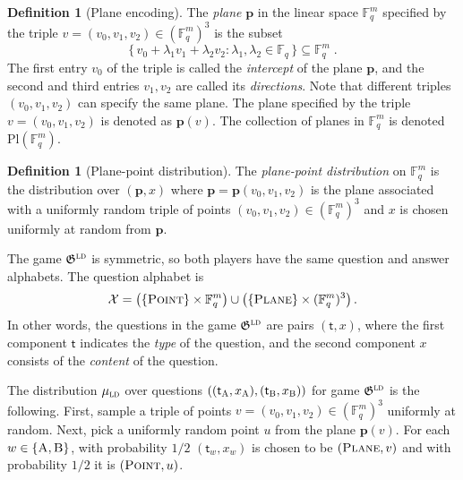 \documentclass[11pt]{article}
\theoremstyle{definition}
\newtheorem{definition}[theorem]{Definition}
\newcommand{\F}{\ensuremath{\mathbb{F}}}
\newcommand{\ld}{\textsc{ld}}
\newcommand{\mX}{\ensuremath{\mathcal{X}}}
\newcommand{\pl}{\mathbf{p}}
\newcommand{\Pl}{\ensuremath{\mathrm{Pl}}}
\newcommand{\game}{\mathfrak{G}}
\newcommand{\labelstyle}[1]{\ensuremath{\textsc{#1}}\xspace}
\newcommand{\tvarstyle}[1]{\mathsf{#1}}
\newcommand{\tvar}{\ensuremath{\tvarstyle{t}}}
\newcommand{\alice}{\labelstyle{A}}
\newcommand{\bob}{\labelstyle{B}}
\newcommand{\typestyle}[1]{\ensuremath{\textsc{#1}}\xspace}
\newcommand{\Plane}{\typestyle{Plane}}
\newcommand{\Point}{\typestyle{Point}}
\newcommand{\AB}{\{\alice, \bob\}}
\begin{document}
\begin{definition}[Plane encoding]
  \label{def:plane-point}
  The \emph{plane} $\pl$ in the linear space $\F^m_q$ specified by the triple $v
  = (v_0, v_1, v_2) \in (\F_q^m)^3$ is the subset
  \begin{equation}
    \label{eq:plane-from-sample}
    \bigl\{\, v_0 + \lambda_1 v_1 + \lambda_2 v_2 : \lambda_1,
    \lambda_2 \in \F_q \,\bigr\} \subseteq \F_q^m\;.
  \end{equation}
  The first entry $v_0$ of the triple is called the \emph{intercept} of the
  plane $\pl$, and the second and third entries $v_1, v_2$ are called its
  \emph{directions}.
  Note that different triples $(v_0, v_1, v_2)$ can specify the same plane.
  The plane specified by the triple $v = (v_0, v_1, v_2)$ is denoted as
  $\pl(v)$.
  The {collection of planes in $\F_q^m$} is denoted $\Pl(\F_q^m)$.
\end{definition}

\begin{definition}[Plane-point distribution]
  \label{def:plane-point-dist}
  The \emph{plane-point distribution} on $\F_q^m$ is the distribution over
  $(\pl,x)$ where $\pl = \pl(v_0,v_1,v_2)$ is the plane associated with a
  uniformly random triple of points $(v_0,v_1,v_2) \in (\F_q^m)^3$ and $x$ is
  chosen uniformly at random from $\pl$.
\end{definition}
The game $\game^\ld$ is symmetric, so both players have the same question and
answer alphabets.
The question alphabet is
\begin{equation*}
	\mX = \left ( \{ \Point \} \times \F_q^m \right ) \cup
  \left ( \{ \Plane \} \times (\F_q^m)^3 \right ).
\end{equation*}
In other words, the questions in the game $\game^\ld$ are pairs $(\tvar,x)$,
where the first component $\tvar$ indicates the \emph{type} of the question, and
the second component $x$ consists of the \emph{content} of the question.

The distribution $\mu_\ld$ over questions $((\tvar_\alice,x_\alice),
(\tvar_\bob, x_\bob))$ for game $\game^\ld$ is the following.
First, sample a triple of points $v = (v_0, v_1, v_2) \in (\F_q^m)^3$ uniformly
at random.
Next, pick a uniformly random point $u$ from the plane $\pl(v)$.
For each $w \in \AB$, with probability $1/2$ $(\tvar_w,x_w)$ is chosen to be
$(\Plane, v)$ and with probability $1/2$ it is $(\Point, u)$.
\end{document}
